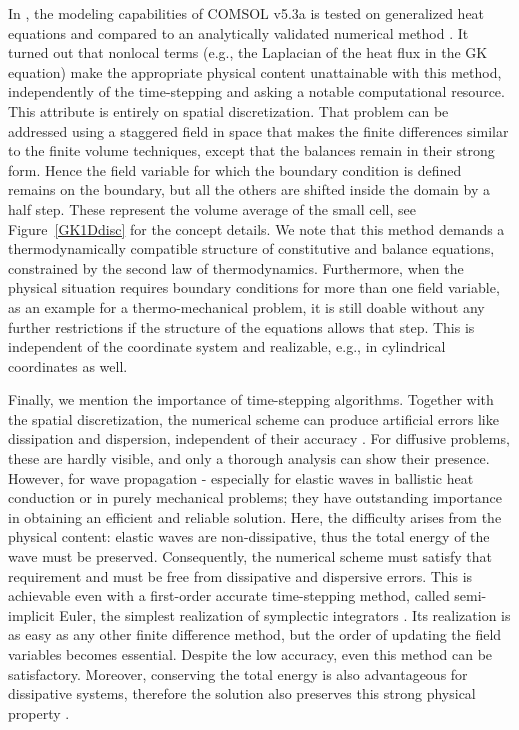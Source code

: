 \documentclass[sn-mathphys]{sn-jnl}%
\theoremstyle{thmstyleone}%
\theoremstyle{thmstyletwo}%
\theoremstyle{thmstylethree}%
\begin{document}
{In \cite{RietEtal18,FulEtal20}, the modeling capabilities of COMSOL v5.3a is tested on generalized heat equations and compared to an analytically validated numerical method \cite{RietEtal18}. It turned out that nonlocal terms (e.g., the Laplacian of the heat flux in the GK equation) make the appropriate physical content unattainable with this method, independently of the time-stepping and asking a notable computational resource. This attribute is entirely on spatial discretization. That problem can be addressed using a staggered field in space that makes the finite differences similar to the finite volume techniques, except that the balances remain in their strong form. Hence the field variable for which the boundary condition is defined remains on the boundary, but all the others are shifted inside the domain by a half step. These represent the volume average of the small cell, see Figure~\ref{GK1Ddisc} for the concept details. We note that this method demands a thermodynamically compatible structure of constitutive and balance equations, constrained by the second law of thermodynamics. Furthermore, when the physical situation requires boundary conditions for more than one field variable, as an example for a thermo-mechanical problem, it is still doable without any further restrictions if the structure of the equations allows that step. This is independent of the coordinate system and realizable, e.g., in cylindrical coordinates as well.

Finally, we mention the importance of time-stepping algorithms. Together with the spatial discretization, the numerical scheme can produce artificial errors like dissipation and dispersion, independent of their accuracy \cite{NumRec07b,JozsKov20b,FulEtal20}. For diffusive problems, these are hardly visible, and only a thorough analysis can show their presence. However, for wave propagation - especially for elastic waves in ballistic heat conduction or in purely mechanical problems; they have outstanding importance in obtaining an efficient and reliable solution. Here, the difficulty arises from the physical content: elastic waves are non-dissipative, thus the total energy of the wave must be preserved. Consequently, the numerical scheme must satisfy that requirement and must be free from dissipative and dispersive errors. This is achievable even with a first-order accurate time-stepping method, called semi-implicit Euler, the simplest realization of symplectic integrators \cite{Romero10I, Romero10II, PortEtal17, ShanOtt20}. Its realization is as easy as any other finite difference method, but the order of updating the field variables becomes essential. Despite the low accuracy, even this method can be satisfactory. Moreover, conserving the total energy is also advantageous for dissipative systems, therefore the solution also preserves this strong physical property \cite{FulEtal20}.
	
}
\end{document}
